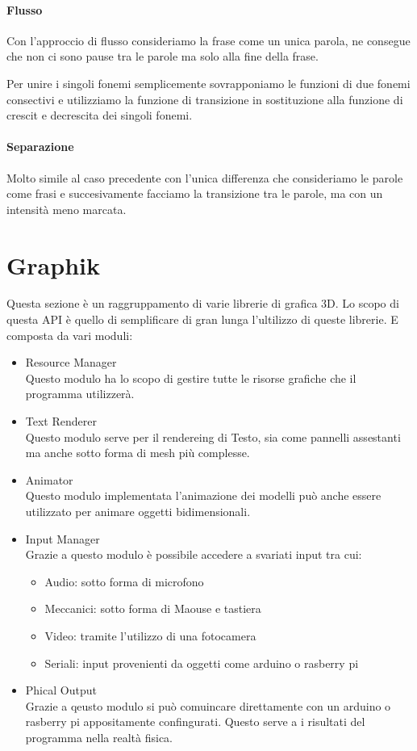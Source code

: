 \documentclass{article}
\begin{document}
\paragraph{Flusso}
Con l'approccio di flusso consideriamo la frase come un unica parola, ne consegue che non ci sono pause tra le parole ma solo alla fine della frase.

Per unire i singoli fonemi semplicemente sovrapponiamo le funzioni di due fonemi consectivi e utilizziamo la funzione di transizione in sostituzione alla funzione di crescit e decrescita dei singoli fonemi.

\paragraph{Separazione}
Molto simile al caso precedente con l'unica differenza che consideriamo le parole come frasi e succesivamente facciamo la transizione tra le parole, ma con un intensità meno marcata.

\section {Graphik}
Questa sezione è un raggruppamento di varie librerie di grafica 3D. Lo scopo di questa API è quello di semplificare di gran lunga l'ultilizzo di queste librerie. E composta da vari moduli:

\begin{itemize}
    \item Resource Manager \\
        Questo modulo ha lo scopo di gestire tutte le risorse grafiche che il programma utilizzerà.
    \item Text Renderer \\
        Questo modulo serve per il rendereing di Testo, sia come pannelli assestanti ma anche sotto forma di mesh più complesse.
    \item Animator \\
        Questo modulo implementata l'animazione dei modelli può anche essere utilizzato per animare oggetti bidimensionali.
    \item Input Manager \\
        Grazie a questo modulo è possibile accedere a svariati input tra cui:
        \begin{itemize}
            \item Audio: sotto forma di microfono
            \item Meccanici: sotto forma di Maouse e tastiera
            \item Video: tramite l'utilizzo di una fotocamera
            \item Seriali: input provenienti da oggetti come arduino o rasberry pi
        \end{itemize}
    \item Phical Output \\
        Grazie a qeusto modulo si può comuincare direttamente con un arduino o rasberry pi appositamente confingurati. Questo serve a i risultati del programma nella realtà fisica.
\end{itemize}
\end{document}
